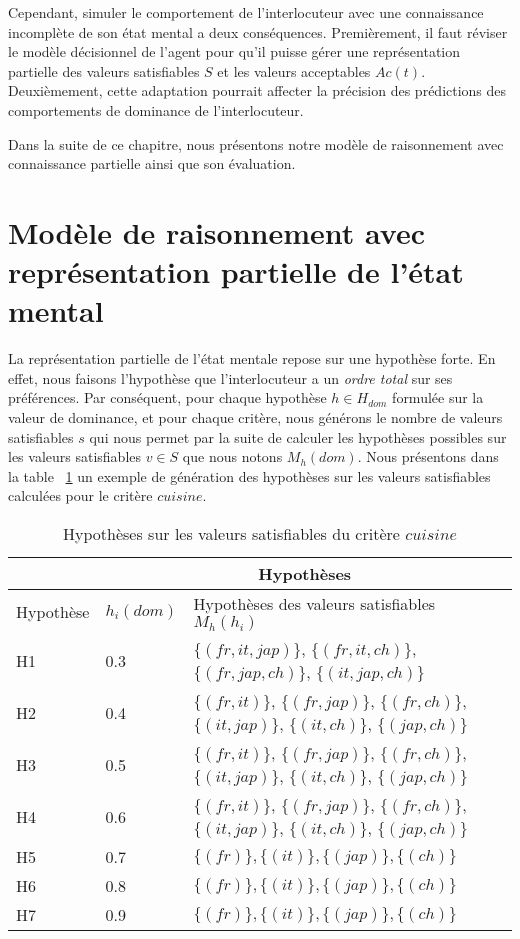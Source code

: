 		Cependant, simuler le comportement de l'interlocuteur avec une connaissance incomplète de son état mental a deux conséquences.
		Premièrement, il faut réviser  le modèle décisionnel de l'agent pour qu'il puisse gérer une représentation partielle des valeurs satisfiables $S$ et les valeurs acceptables $Ac(t)$. Deuxièmement, cette adaptation pourrait affecter la précision des prédictions des comportements de dominance de l'interlocuteur.
		
		Dans la suite de ce chapitre, nous présentons notre modèle de raisonnement avec connaissance partielle ainsi que son évaluation. 
		
			

\section{Modèle de raisonnement avec représentation partielle de l'état mental}
	La représentation partielle de l'état mentale repose sur une hypothèse forte. En effet, nous faisons l'hypothèse que l'interlocuteur a un \textit{ordre total} sur ses préférences. Par conséquent, pour chaque hypothèse $h\in H_{dom} $ formulée sur la valeur de dominance, et pour chaque critère, nous générons le nombre de valeurs satisfiables $s$ qui nous permet par la suite de calculer les hypothèses possibles sur les valeurs satisfiables $v\in S$ que nous notons $M_h(dom)$. Nous présentons dans la table ~\ref{tab:hypo} un exemple de génération des hypothèses sur les valeurs satisfiables calculées pour le critère $cuisine$. 


		\begin{table}[!tb]
			\centering
			\caption{Hypothèses sur les valeurs satisfiables du critère $cuisine$}
			\begin{tabular}{ p{2cm} p{1.5cm} p{8cm}}
				\hline
				\hline
				& \multicolumn{2}{c}{Hypothèses}  \\
				\hline
				\hline
				Hypothèse & $h_i(dom)$ & Hypothèses des valeurs satisfiables $ M_h(h_i)$\\
				\hline
				H1&0.3&$\{(fr,it,jap)\}$, $\{(fr,it,ch)\}$, $\{(fr,jap,ch)\}$, $\{(it,jap,ch)\}$ \\
				\hline
				H2&0.4&$\{(fr,it)\}$, $\{(fr,jap)\}$, $\{(fr,ch)\}$, $\{(it,jap)\}$, $\{(it,ch)\}$, $\{(jap,ch)\}$ \\
				\hline
				H3&0.5&$\{(fr,it)\}$, $\{(fr,jap)\}$, $\{(fr,ch)\}$, $\{(it,jap)\}$, $\{(it,ch)\}$, $\{(jap,ch)\}$\\
				\hline
				H4&0.6&$\{(fr,it)\}$, $\{(fr,jap)\}$, $\{(fr,ch)\}$, $\{(it,jap)\}$, $\{(it,ch)\}$, $\{(jap,ch)\}$ \\
				\hline
				H5&0.7&$\{(fr)\}, \{(it)\}, \{(jap)\}, \{(ch)\}$\\
				\hline
				H6&0.8&$\{(fr)\}, \{(it)\}, \{(jap)\}, \{(ch)\}$ \\
				\hline
				
				H7&0.9&$\{(fr)\}, \{(it)\}, \{(jap)\}, \{(ch)\}$ \\
				\hline
				\hline
			\end{tabular}		
			\label{tab:hypo}
		\end{table}
		
